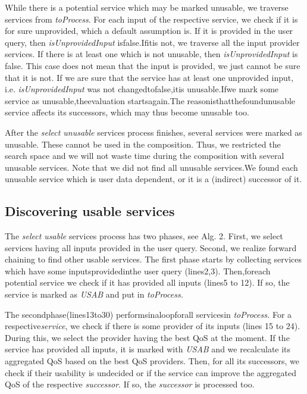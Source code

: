 \documentclass{llncs}
\begin{document}
While there is a potential service which may be marked unusable, we traverse 
services from\textit{ toProcess}. For each input of the respective service, we check if it 
is for sure unprovided, which a default assumption is. If it is provided in the user 
query, then\textit{ isUnprovidedInput} isfalse.Ifitis not, we traverse all the input provider 
services. If there is at least one which is not unusable, then\textit{ isUnprovidedInput} is 
false. This case does not mean that the input is provided, we just cannot be sure 
that it is not. If we are sure that the service has at least one unprovided input, i.e. 
\textit{isUnprovidedInput} was not changedtofalse,itis unusable.Ifwe mark some service 
as unusable,theevaluation startsagain.The reasonisthatthefoundunusable service 
affects its successors, which may thus become unusable too. 

After the \textit{select unusable} services process finishes, several services were marked 
as unusable. These cannot be used in the composition. Thus, we restricted the search 
space and we will not waste time during the composition with several unusable 
services. Note that we did not find all unusable services.We found each unusable 
service which is user data dependent, or it is a (indirect) successor of it. 
\clearpage

\subsection{Discovering usable services }

The\textit{ select usable} services process has two phases, see Alg. 2. First, we select services 
having all inputs provided in the user query. Second, we realize forward chaining 
to find other usable services. The first phase starts by collecting services which 
have some inputsprovidedinthe user query (lines2,3). Then,foreach potential 
service we check if it has provided all inputs (lines5 to 12). If so, the service is 
marked as\textit{ USAB} and put in\textit{ toProcess. }

The secondphase(lines13to30) performsinaloopforall servicesin\textit{ toProcess. }
For a respective\textit{service}, we check if there is some provider of its inputs (lines 15 
to 24). During this, we select the provider having the best QoS at the moment. If 
the service has provided all inputs, it is marked with \textit{USAB }and we recalculate its 
aggregated QoS based on the best QoS providers. Then, for all its successors, we 
check if their usability is undecided or if the service can improve the aggregated 
QoS of the respective\textit{ successor}. If so, the\textit{ successor} is processed too. 
\end{document}
